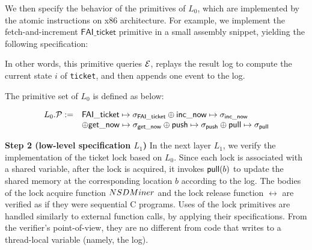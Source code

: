 We then specify the behavior of the primitives
of $L_0$, which are implemented by the atomic instructions on x86 architecture. 
For example, we implement the
fetch-and-increment $\mathsf{FAI\_ticket}$ primitive in a small 
assembly snippet, yielding the following specification:
\begin{small}
\begin{mathpar}
\end{mathpar}
\vspace{-5pt}
\end{small}%

In other words, this primitive queries $\oracle$, replays the result log to
compute the current state $i$ of {\tt ticket},
and then appends one
 event to the log. 
The primitive set of $L_0$ is defined as below:
\begin{small}
\[
\begin{array}{rl}
L_0.\primt := &\mathsf{FAI\_ticket} \mapsto \spec_{\mathsf{FAI\_ticket}}
\oplus \mathsf{inc\_now} \mapsto \spec_{\mathsf{inc\_now}} \\
&\oplus \mathsf{get\_now} \mapsto \spec_{\mathsf{get\_now}}\oplus  \push\mapsto \spec_{\push}
\oplus  \pull\mapsto \spec_{\pull}
\end{array}
\]
\end{small}%
\noindent\textbf{Step 2 (low-level specification $L_1$)}
In the next layer $L_1$, 
we verify the implementation of the ticket lock based on
 $L_0$. Since each lock is associated with a shared variable,
after the lock is acquired, it invokes $\pull(b)$ 
to update the shared memory at the corresponding location $b$
according to the log.
The bodies of the lock acquire function $\acq$ and 
the lock release function $\rel$ are verified as if they were 
sequential C programs. Uses of the lock primitives are handled
similarly to external function calls, by applying their
specifications. From the verifier's point-of-view, they are no 
different from code
that writes to a thread-local variable (namely, the log). 

